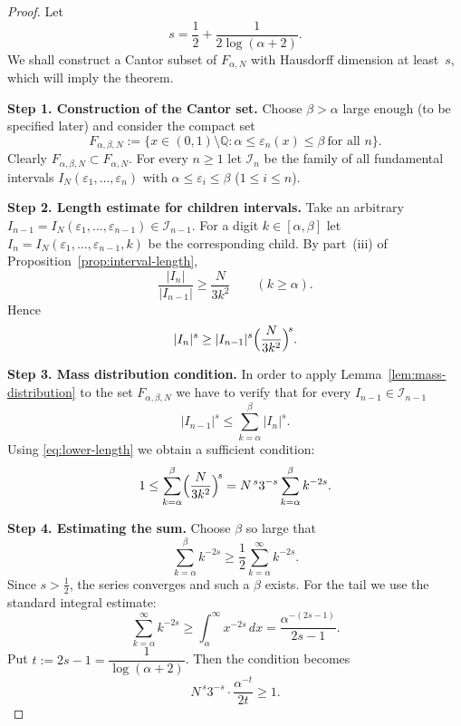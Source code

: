 \documentclass[12pt]{article}
\numberwithin{equation}{section}
\begin{document}
\begin{proof}
Let 
\[
s=\frac12+\frac{1}{2\log(\alpha+2)}.
\]
We shall construct a Cantor subset of $F_{\alpha,N}$ with Hausdorff dimension at least~$s$, which will imply the theorem.

\medskip\noindent
\textbf{Step 1.  Construction of the Cantor set.}
Choose $\beta>\alpha$ large enough (to be specified later) and consider the compact set
\[
F_{\alpha,\beta,N}:=\{x\in(0,1)\setminus\mathbb{Q}:\alpha\le\varepsilon_n(x)\le\beta\ \text{for all }n\}.
\]
Clearly $F_{\alpha,\beta,N}\subset F_{\alpha,N}$.
For every $n\ge1$ let $\mathscr{I}_n$ be the family of all fundamental intervals 
$I_N(\varepsilon_1,\dots ,\varepsilon_n)$ with $\alpha\le\varepsilon_i\le\beta$ ($1\le i\le n$).

\medskip\noindent
\textbf{Step 2. Length estimate for children intervals.}
Take an arbitrary $I_{n-1}=I_N(\varepsilon_1,\dots ,\varepsilon_{n-1})\in\mathscr{I}_{n-1}$.
For a digit $k\in[\alpha,\beta]$ let $I_n=I_N(\varepsilon_1,\dots ,\varepsilon_{n-1},k)$ be the corresponding child.
By part~(iii) of Proposition~\ref{prop:interval-length},
\[
\frac{|I_n|}{|I_{n-1}|}\ge\frac{N}{3k^2}\qquad(k\ge\alpha).
\]
Hence
\begin{equation}\label{eq:lower-length}
|I_n|^s\ge|I_{n-1}|^s\Bigl(\frac{N}{3k^2}\Bigr)^{\!s}.
\end{equation}

\medskip\noindent
\textbf{Step 3. Mass distribution condition.}
In order to apply Lemma~\ref{lem:mass-distribution} to the set $F_{\alpha,\beta,N}$
we have to verify that for every $I_{n-1}\in\mathscr{I}_{n-1}$
\[
|I_{n-1}|^s\le\sum_{k=\alpha}^{\beta}|I_n|^s .
\]
Using \eqref{eq:lower-length} we obtain a sufficient condition:
\[
1\le\sum_{k=\alpha}^{\beta}\Bigl(\frac{N}{3k^2}\Bigr)^{\!s}
      =N^{\,s}3^{-s}\sum_{k=\alpha}^{\beta}k^{-2s}.
\]

\medskip\noindent
\textbf{Step 4. Estimating the sum.}
Choose $\beta$ so large that
\[
\sum_{k=\alpha}^{\beta}k^{-2s}\ge\frac12\sum_{k=\alpha}^{\infty}k^{-2s}.
\]
Since $s>\frac12$, the series converges and such a $\beta$ exists.
For the tail we use the standard integral estimate:
\[
\sum_{k=\alpha}^{\infty}k^{-2s}\ge\int_{\alpha}^{\infty}x^{-2s}\,dx
    =\frac{\alpha^{-(2s-1)}}{2s-1}.
\]
Put $t:=2s-1=\dfrac{1}{\log(\alpha+2)}$.  Then the condition becomes
\begin{equation}\label{eq:final-cond-lower}
N^{\,s}3^{-s}\cdot\frac{\alpha^{-t}}{2t}\ge1 .
\end{equation}


\end{proof}
\end{document}
